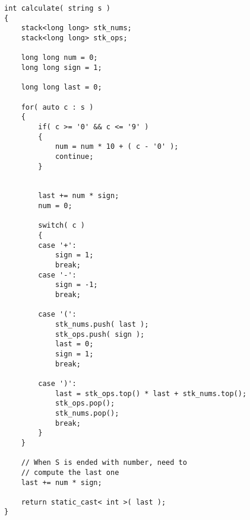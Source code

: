 \setcounter{lstlisting}{0}
\begin{lstlisting}[style=customc, caption={Stack}]
int calculate( string s )
{
    stack<long long> stk_nums;
    stack<long long> stk_ops;

    long long num = 0;
    long long sign = 1;

    long long last = 0;

    for( auto c : s )
    {
        if( c >= '0' && c <= '9' )
        {
            num = num * 10 + ( c - '0' );
            continue;
        }


        last += num * sign;
        num = 0;

        switch( c )
        {
        case '+':
            sign = 1;
            break;
        case '-':
            sign = -1;
            break;

        case '(':
            stk_nums.push( last );
            stk_ops.push( sign );
            last = 0;
            sign = 1;
            break;

        case ')':
            last = stk_ops.top() * last + stk_nums.top();
            stk_ops.pop();
            stk_nums.pop();
            break;
        }
    }

	// When S is ended with number, need to 
	// compute the last one
    last += num * sign;

    return static_cast< int >( last );
}
\end{lstlisting}